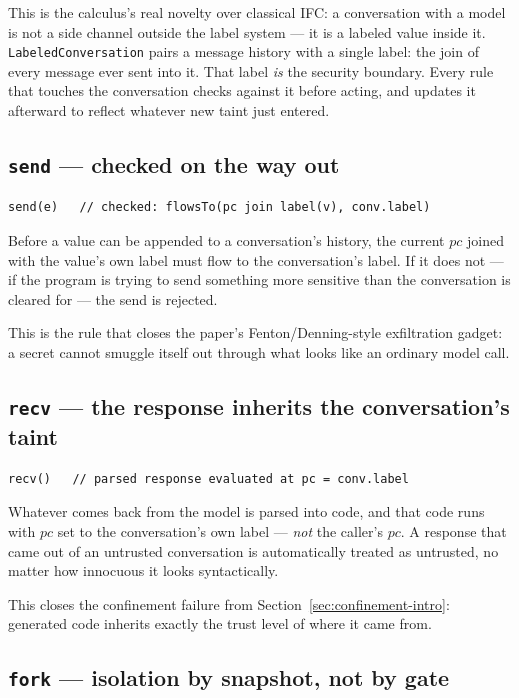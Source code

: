 \documentclass[11pt, a4paper]{article}
\begin{document}
This is the calculus's real novelty over classical IFC: a conversation
with a model is not a side channel outside the label system --- it is a
labeled value inside it. \texttt{LabeledConversation} pairs a message
history with a single label: the join of every message ever sent into it.
That label \emph{is} the security boundary. Every rule that touches the
conversation checks against it before acting, and updates it afterward to
reflect whatever new taint just entered.

\subsection{\texttt{send} --- checked on the way out}

\begin{lstlisting}
send(e)   // checked: flowsTo(pc join label(v), conv.label)
\end{lstlisting}

Before a value can be appended to a conversation's history, the current
$pc$ joined with the value's own label must flow to the conversation's
label. If it does not --- if the program is trying to send something more
sensitive than the conversation is cleared for --- the send is rejected.

This is the rule that closes the paper's Fenton/Denning-style exfiltration
gadget: a secret cannot smuggle itself out through what looks like an ordinary
model call.

\subsection{\texttt{recv} --- the response inherits the conversation's taint}

\begin{lstlisting}
recv()   // parsed response evaluated at pc = conv.label
\end{lstlisting}

Whatever comes back from the model is parsed into code, and that code
runs with $pc$ set to the conversation's own label --- \emph{not} the
caller's $pc$. A response that came out of an untrusted conversation is
automatically treated as untrusted, no matter how innocuous it looks
syntactically. 

This closes the confinement failure from Section~\ref{sec:confinement-intro}:
generated code inherits exactly the trust level of where it came from.

\subsection{\texttt{fork} --- isolation by snapshot, not by gate}
\end{document}
